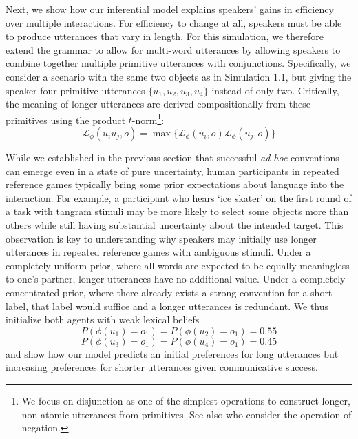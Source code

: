 Next, we show how our inferential model explains speakers' gains in efficiency over multiple interactions. 
For efficiency to change at all, speakers must be able to produce utterances that vary in length. 
For this simulation, we therefore extend the grammar to allow for multi-word utterances by allowing speakers to combine together multiple primitive utterances with conjunctions.
Specifically, we consider a scenario with the same two objects as in Simulation 1.1, but giving the speaker four primitive utterances $\{u_1, u_2, u_3, u_4\}$ instead of only two. 
Critically, the meaning of longer utterances are derived compositionally from these primitives using the product $t$-norm\footnote{We focus on disjunction as one of the simplest operations to construct longer, non-atomic utterances from primitives. See also  who consider the operation of negation.}:
$$\mathcal{L}_\phi(u_iu_j, o) = \max\{\mathcal{L}_\phi(u_i, o)  \mathcal{L}_\phi(u_j, o)\}$$


While we established in the previous section that successful \emph{ad hoc} conventions can emerge even in a state of pure uncertainty, human participants in repeated reference games typically bring some prior expectations about language into the interaction.
For example, a participant who hears `ice skater' on the first round of a task with tangram stimuli may be more likely to select some objects more than others while still having substantial uncertainty about the intended target.
This observation is key to understanding why speakers may initially use longer utterances in repeated reference games with ambiguous stimuli. 
Under a completely uniform prior, where all words are expected to be equally meaningless to one's partner, longer utterances have no additional value. 
Under a completely concentrated prior, where there already exists a strong convention for a short label, that label would suffice and a longer utterances is redundant.
We thus initialize both agents with weak lexical beliefs
$$P(\phi(u_1) = o_1) = P(\phi(u_2) = o_1) = 0.55$$ 
$$P(\phi(u_3) = o_1) = P(\phi(u_4) = o_1) = 0.45$$
and show how our model predicts an initial preferences for long utterances but increasing preferences for shorter utterances given communicative success.



